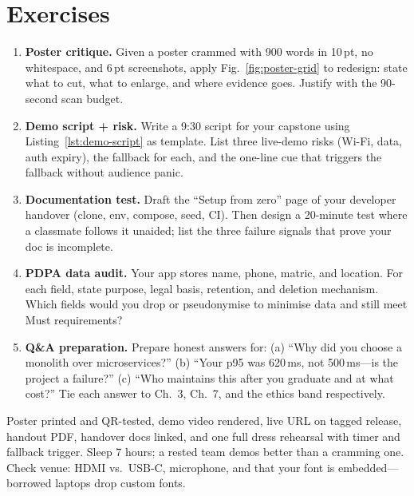 \section{Exercises}
\label{sec:ch08-exercises}
\begin{enumerate}[label=E8.\arabic*, leftmargin=*, itemsep=0.6em]
    \item \textbf{Poster critique.} Given a poster crammed with 900 words in 10\,pt, no whitespace, and 6\,pt screenshots, apply Fig.~\ref{fig:poster-grid} to redesign: state what to cut, what to enlarge, and where evidence goes. Justify with the 90-second scan budget.
    \item \textbf{Demo script + risk.} Write a 9:30 script for your capstone using Listing~\ref{lst:demo-script} as template. List three live-demo risks (Wi-Fi, data, auth expiry), the fallback for each, and the one-line cue that triggers the fallback without audience panic.
    \item \textbf{Documentation test.} Draft the ``Setup from zero'' page of your developer handover (clone, env, compose, seed, CI). Then design a 20-minute test where a classmate follows it unaided; list the three failure signals that prove your doc is incomplete.
    \item \textbf{PDPA data audit.} Your app stores name, phone, matric, and location. For each field, state purpose, legal basis, retention, and deletion mechanism. Which fields would you drop or pseudonymise to minimise data and still meet Must requirements?
    \item \textbf{Q\&A preparation.} Prepare honest answers for: (a) ``Why did you choose a monolith over microservices?'' (b) ``Your p95 was 620\,ms, not 500\,ms---is the project a failure?'' (c) ``Who maintains this after you graduate and at what cost?'' Tie each answer to Ch.~3, Ch.~7, and the ethics band respectively.
\end{enumerate}
\begin{remark}
Poster printed and QR-tested, demo video rendered, live URL on tagged release, handout PDF, handover docs linked, and one full dress rehearsal with timer and fallback trigger. Sleep 7 hours; a rested team demos better than a cramming one. Check venue: HDMI vs.\ USB-C, microphone, and that your font is embedded---borrowed laptops drop custom fonts.
\end{remark}

